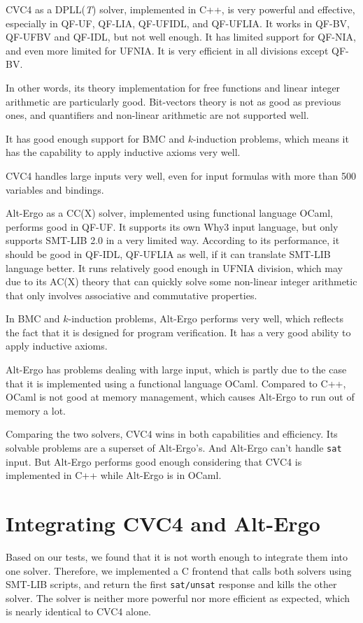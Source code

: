 \documentclass[10pt,letter]{article}
\theoremstyle{definition}
\begin{document}
CVC4 as a DPLL({\it T}) solver, implemented in C++, is very powerful and effective, especially in QF-UF, QF-LIA, QF-UFIDL, and QF-UFLIA. It works in QF-BV, QF-UFBV and QF-IDL, but not well enough. It has limited support for QF-NIA, and even more limited for UFNIA. It is very efficient in all divisions except QF-BV.

In other words, its theory implementation for free functions and linear integer arithmetic are particularly good. Bit-vectors theory is not as good as previous ones, and quantifiers and non-linear arithmetic are not supported well.

It has good enough support for BMC and $k$-induction problems, which means it has the capability to apply inductive axioms very well.

CVC4 handles large inputs very well, even for input formulas with more than 500 variables and bindings.

Alt-Ergo as a CC(X) solver, implemented using functional language OCaml, performs good in QF-UF. It supports its own Why3 input language, but only supports SMT-LIB 2.0 in a very limited way. According to its performance, it should be good in QF-IDL, QF-UFLIA as well, if it can translate SMT-LIB language better. It runs relatively good enough in UFNIA division, which may due to its AC(X) theory that can quickly solve some non-linear integer arithmetic that only involves associative and commutative properties.

In BMC and $k$-induction problems, Alt-Ergo performs very well, which reflects the fact that it is designed for program verification. It has a very good ability to apply inductive axioms.

Alt-Ergo has problems dealing with large input, which is partly due to the case that it is implemented using a functional language OCaml. Compared to C++, OCaml is not good at memory management, which causes Alt-Ergo to run out of memory a lot.

Comparing the two solvers, CVC4 wins in both capabilities and efficiency. Its solvable problems are a superset of Alt-Ergo's. And Alt-Ergo can't handle {\tt sat} input. But Alt-Ergo performs good enough considering that CVC4 is implemented in C++ while Alt-Ergo is in OCaml.

\section{Integrating CVC4 and Alt-Ergo}

Based on our tests, we found that it is not worth enough to integrate them into one solver. Therefore, we implemented a C frontend that calls both solvers using SMT-LIB scripts, and return the first {\tt sat/unsat} response and kills the other solver. The solver is neither more powerful nor more efficient as expected, which is nearly identical to CVC4 alone.
\end{document}

